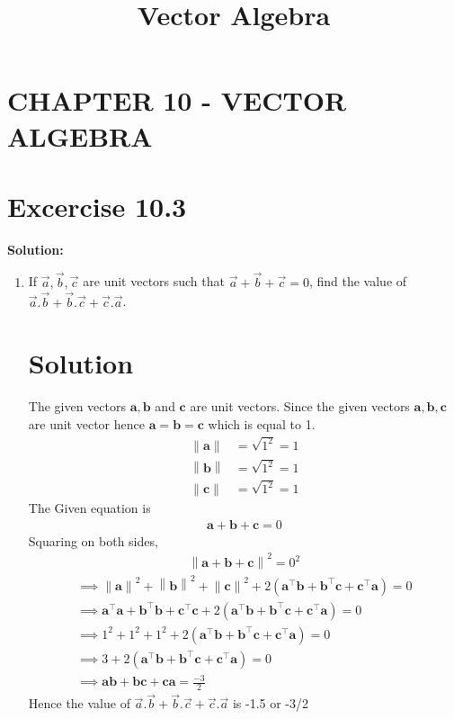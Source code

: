 \documentclass[12pt]{article}
\let\vec\mathbf
\providecommand{\norm}[1]{\left\lVert#1\right\rVert}
\newcommand{\solution}{\noindent \textbf{Solution: }}
\let\vec\mathbf
\begin{document}
\begin{center}
\title{\textbf{Vector Algebra}}
\date{\vspace{-5ex}} %
\maketitle
\end{center}
\setcounter{page}{1}
\section*{CHAPTER 10 - VECTOR ALGEBRA}
\section*{Excercise 10.3}
\solution 
\begin{enumerate}
\item If $\overrightarrow{a},\overrightarrow{b},\overrightarrow{c}$ are unit vectors such that $\overrightarrow{a}+\overrightarrow{b}+\overrightarrow{c}=0$, find the value of $\overrightarrow{a}.\overrightarrow{b}+\overrightarrow{b}.\overrightarrow{c}+\overrightarrow{c}.\overrightarrow{a}$.  
\section{Solution}
The given vectors $\vec{a},\vec{b}$ and $\vec{c}$ are unit vectors. Since the given vectors $\vec{a},\vec{b},\vec{c}$ are unit vector hence $\vec{a}=\vec{b}=\vec{c}$ which is equal to 1.
        \begin{align}
\norm{\vec{a}} &=\sqrt{1^2}=1\\ \norm{\vec{b}}&=\sqrt{1^2}=1\\ \norm{\vec{c}}&=\sqrt{1^2}=1
        \end{align}
The Given equation is 
        \begin{align}
\vec{a}+\vec{b}+\vec{c}=0
\end{align}      
Squaring on both sides,
\begin{align}
\norm{{\vec{a}}+{\vec{b}}+{\vec{c}}}^2=0^2
\end{align}
\begin{align}
\implies{\norm{\vec{a}}}^2+{\norm{\vec{b}}}^2+{\norm{\vec{c}}}^2+2({{\vec{a}^\top}{\vec{b}}+{\vec{b}^\top}{\vec{c}}+{\vec{c}^\top}{\vec{a}}})=0\\
\implies{\vec{a}^\top\vec{a}}+{\vec{b}^\top\vec{b}}+{\vec{c}^\top\vec{c}}+2({{\vec{a}^\top}{\vec{b}}+{\vec{b}^\top}{\vec{c}}+{\vec{c}^\top}{\vec{a}}})=0\\
\implies{1}^2+{1}^2+{1}^2+2({{\vec{a}^\top}{\vec{b}}+{\vec{b}^\top}{\vec{c}}+{\vec{c}^\top}{\vec{a}}})=0\\
\implies3+2({{\vec{a}^\top}{\vec{b}}+{\vec{b}^\top}{\vec{c}}+{\vec{c}^\top}{\vec{a}}})=0\\
\implies{\vec{a}}{\vec{b}}+{\vec{b}}{\vec{c}}+{\vec{c}}{\vec{a}}=\frac{-3}{2}
\end{align}
Hence the value of $\overrightarrow{a}.\overrightarrow{b}+\overrightarrow{b}.\overrightarrow{c}+\overrightarrow{c}.\overrightarrow{a}$ is -1.5 or -3/2
\end{enumerate}
\end{document}
